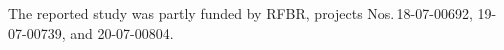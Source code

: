 

\vspace*{-8pt}

\Ack
\noindent
The reported study was partly funded by RFBR, projects 
Nos.\,18-07-00692, 19-07-00739, and 20-07-00804.

\vspace*{6pt}

  \begin{multicols}{2}

\renewcommand{\bibname}{\protect\rmfamily References}

{\small\frenchspacing
 {%
 \begin{thebibliography}{99}


\end{thebibliography}}}
\end{multicols}
